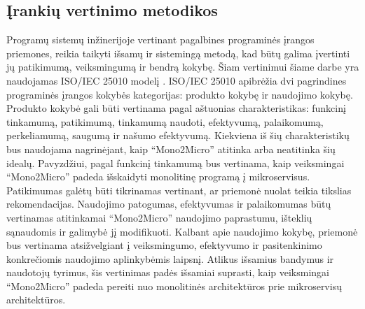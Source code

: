 \documentclass{VUMIFPSbakalaurinis}
\begin{document}
\subsection{Įrankių vertinimo metodikos}
 Programų sistemų inžinerijoje vertinant pagalbines programinės įrangos priemones, reikia taikyti išsamų ir sistemingą metodą, kad būtų galima įvertinti jų patikimumą, veiksmingumą ir bendrą kokybę. Šiam vertinimui šiame darbe yra naudojamas ISO/IEC 25010 modelį \cite{iso}. ISO/IEC 25010 apibrėžia dvi pagrindines programinės įrangos kokybės kategorijas: produkto kokybę ir naudojimo kokybę. Produkto kokybė gali būti vertinama pagal aštuonias charakteristikas: funkcinį tinkamumą, patikimumą, tinkamumą naudoti, efektyvumą, palaikomumą, perkeliamumą, saugumą ir našumo efektyvumą. Kiekviena iš šių charakteristikų bus naudojama nagrinėjant, kaip \enquote{Mono2Micro} atitinka arba neatitinka šių idealų. Pavyzdžiui, pagal funkcinį tinkamumą bus vertinama, kaip veiksmingai \enquote{Mono2Micro} padeda išskaidyti monolitinę programą į mikroservisus. Patikimumas galėtų būti tikrinamas vertinant, ar priemonė nuolat teikia tikslias rekomendacijas. Naudojimo patogumas, efektyvumas ir palaikomumas būtų vertinamas atitinkamai \enquote{Mono2Micro} naudojimo paprastumu, išteklių sąnaudomis ir galimybė jį modifikuoti. Kalbant apie naudojimo kokybę, priemonė bus vertinama atsižvelgiant į veiksmingumo, efektyvumo ir pasitenkinimo konkrečiomis naudojimo aplinkybėmis laipsnį. Atlikus išsamius bandymus ir naudotojų tyrimus, šis vertinimas padės išsamiai suprasti, kaip veiksmingai \enquote{Mono2Micro} padeda pereiti nuo monolitinės architektūros prie mikroservisų architektūros.
 
\end{document}
